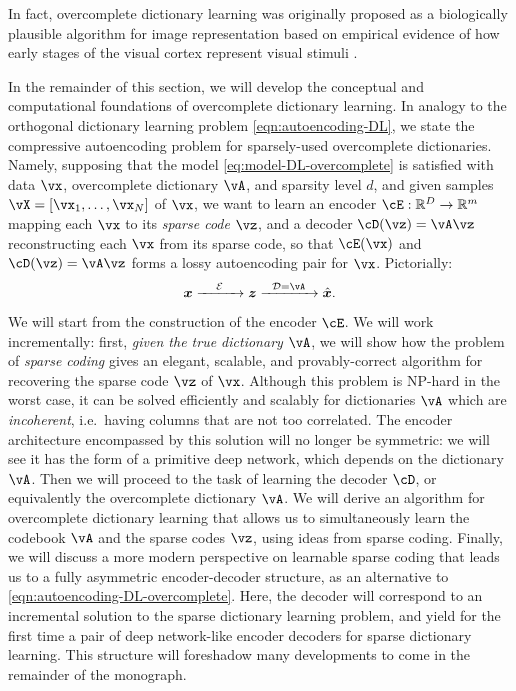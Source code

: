\documentclass[../../book-main.tex]{subfiles}
\begin{document}
In fact, overcomplete dictionary learning was originally proposed as a biologically plausible algorithm for image representation based on empirical evidence of how early stages of the visual cortex represent visual stimuli \cite{Olshausen1996-ap,Olshausen1997-yv}. 

In the remainder of this section, we will develop the conceptual and computational foundations of overcomplete dictionary learning.
In analogy to the orthogonal dictionary learning problem \eqref{eqn:autoencoding-DL}, we state the compressive autoencoding problem for sparsely-used overcomplete dictionaries. Namely, supposing that the model \eqref{eq:model-DL-overcomplete} is satisfied with data \(\vx\), overcomplete dictionary \(\vA\), and sparsity level \(d\), and given samples \(\vX = [\vx_1, \dots, \vx_N]\) of \(\vx\), we want to learn an encoder \(\cE : \R^D \to \R^m\) mapping each \(\vx\) to its \textit{sparse code} \(\vz\), and a decoder \(\cD(\vz) = \vA \vz\) reconstructing each \(\vx\) from its sparse code, so that \(\cE(\vx)\) and \(\cD(\vz) = \vA\vz\) forms a lossy autoencoding pair for \(\vx\). Pictorially:
\begin{equation}
\x \xrightarrow{\hspace{4mm} \mathcal{E} \hspace{4mm}}  \z \xrightarrow{\hspace{2mm} \mathcal{D} = \vA \hspace{2mm}}   \hat{\x}.  
\label{eqn:autoencoding-DL-overcomplete}
\end{equation}    
We will start from the construction of the encoder $\cE$.
We will work incrementally: first, \textit{given the true dictionary $\vA$}, we will show how the problem of \textit{sparse coding} gives an elegant, scalable, and provably-correct algorithm for recovering the sparse code $\vz$ of $\vx$.
Although this problem is NP-hard in the worst case, it can be solved efficiently and scalably for dictionaries $\vA$ which are \textit{incoherent}, i.e.\ having columns that are not too correlated.
The encoder architecture encompassed by this solution will no longer be symmetric: we will see it has the form of a primitive deep network, which depends on the dictionary $\vA$.
Then we will proceed to the task of learning the decoder $\cD$, or equivalently the overcomplete dictionary $\vA$.
We will derive an algorithm for overcomplete dictionary learning that allows us 
to simultaneously learn the codebook $\vA$ and the sparse codes $\vz$, using ideas from sparse coding.
Finally, we will discuss a more modern perspective on learnable sparse coding that leads us to a fully asymmetric encoder-decoder structure, as an alternative to \eqref{eqn:autoencoding-DL-overcomplete}.
Here, the decoder will correspond to an incremental solution to the sparse dictionary learning problem, and yield for the first time a pair of deep network-like encoder decoders for sparse dictionary learning.
This structure will foreshadow many developments to come in the remainder of the monograph.
\end{document}

